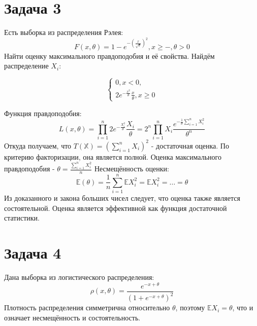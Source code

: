 \documentclass[11pt]{article}
\begin{document}
\section{Задача 3}
\label{sec:orga061e39}
Есть выборка из распределения Рэлея:
$$F(x, \theta) = 1 - e^{-\left(\frac{x}{\sqrt\theta}\right)^2}, x \geq -, \theta > 0$$
Найти оценку максимального правдоподобия и её свойства.
Найдём распределение \(X_i\):
\begin{latex}
\begin{equation*}
\begin{cases}
0, x < 0, \\
2e^{-\frac{x^2}{\theta}}\frac{x}\theta, x \geq 0
\end{cases}
\end{equation*}
\end{latex}
Функция правдоподобия:
$$L(x, \theta) = \prod_{i = 1}^n2e^{-\frac{X_i^2}{\theta}}\frac{X_i}{\theta}
= 2^n\prod_{i = 1}^n{X_i}\frac{e^{-\frac{1}\theta\sum_{i = 1}^n{X_i^2}}}{\theta^n}$$
Откуда получаем, что \(T(\mathbb{X}) = (\sum_{i = 1}^nX_i)^2\) - достаточная оценка. По критерию факторизации, она
является полной. Оценка максимального правдоподобия - \(\theta = \frac{\sum_{i = 1}^nX_i^2}n\)
Несмещённость оценки:
$$\mathbb{E}(\theta) = \frac{1}n\sum_{i = 1}^n\mathbb{E}X_i^2 = \mathbb{E}X_i^2 = \ldots = \theta$$
Из доказанного и закона больших чисел следует, что оценка также является состоятельной. Оценка является
эффективной как функция достаточной статистики.
\section{Задача 4}
\label{sec:orgeea67d8}
Дана выборка из логистического распределения:
$$\rho(x, \theta) = \frac{e^{-x + \theta}}{(1 + e^{-x + \theta})^2}$$
Плотность распределения симметрична относительно \(\theta\), поэтому \(\mathbb{E}X_i = \theta\), что и означает
несмещённость и состоятельность.
\end{document}

